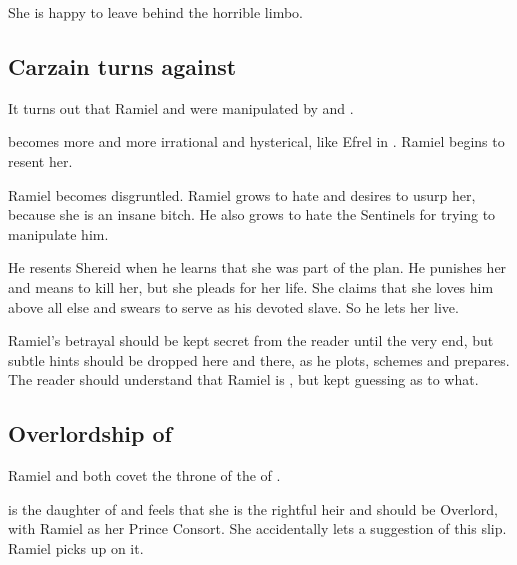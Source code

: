 She is happy to leave behind the horrible limbo.








\subsection{Carzain turns against \Belzir} 
It turns out that Ramiel and \Belzir{} were manipulated by \Secherdamon{} and \Psyrex. 

\Belzir becomes more and more irrational and hysterical, like Efrel in \cite{KarlEdwardWagner:DarknessWeaves}. 
Ramiel begins to resent her. 

Ramiel becomes disgruntled. 
Ramiel grows to hate \Belzir{} and desires to usurp her, because she is an insane bitch. He also grows to hate the Sentinels for trying to manipulate him. 

He resents Shereid when he learns that she was part of the plan. He punishes her and means to kill her, but she pleads for her life. She claims that she loves him above all else and swears to serve as his devoted slave. So he lets her live. 

Ramiel's betrayal should be kept secret from the reader until the very end, but subtle hints should be dropped here and there, as he plots, schemes and prepares. The reader should understand that Ramiel is , but kept guessing as to what.









\subsection{Overlordship of \Mystraacht}
Ramiel and \Shiaraid{} both covet the throne of the  of \Mystraacht. 

\Shiaraid{} is the daughter of  and feels that she is the rightful heir and should be Overlord, with Ramiel as her Prince Consort. 
She accidentally lets a suggestion of this slip. 
Ramiel picks up on it. 


